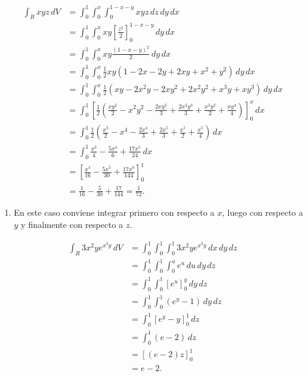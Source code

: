 \documentclass[
  spanish,
  a4paper,
]{scrreport}
\providecommand{\tightlist}{%
  \setlength{\itemsep}{0pt}\setlength{\parskip}{0pt}}
\theoremstyle{definition}
\theoremstyle{remark}
\begin{document}
\begin{tcolorbox}
\begin{align*}
\int_R xyz\,dV
&= \int_0^1 \int_0^{x} \int_0^{1-x-y} xyz\,dz\,dy\,dx \\  
&= \int_0^1 \int_0^{x} xy\left[\frac{z^2}{2}\right]_0^{1-x-y} \,dy\,dx \\  
&= \int_0^1 \int_0^{x} xy\frac{(1-x-y)^2}{2} \,dy\,dx \\  
&= \int_0^1 \int_0^{x} \frac{1}{2}xy(1-2x-2y+2xy+x^2+y^2)\,dy\,dx \\
&= \int_0^1 \int_0^{x} \frac{1}{2}(xy-2x^2y-2xy^2+2x^2y^2+x^3y+xy^3)\,dy\,dx \\
&= \int_0^1 \left[\frac{1}{2}\left(\frac{x y^2}{2}-x^2 y^2 -\frac{2x y^3}{3} + \frac{2x^2 y^3}{3} + \frac{x^3 y^2}{2} + \frac{x y^4}{4}\right)\right]_0^{x} \,dx \\
&= \int_0^1 \frac{1}{2}\left(\frac{x^3}{2}-x^4 -\frac{2x^4}{3} + \frac{2x^5}{3} + \frac{x^5}{2} + \frac{x^5}{4}\right)\,dx \\
&= \int_0^1 \frac{x^3}{4} - \frac{5x^4}{6} + \frac{17x^5}{24}\,dx \\
&= \left[\frac{x^4}{16} - \frac{5x^5}{30} + \frac{17x^6}{144}\right]_0^1 \\
&= \frac{1}{16} - \frac{5}{30} + \frac{17}{144} 
= \frac{1}{72}.
\end{align*}

\begin{enumerate}
\def\labelenumi{\alph{enumi}.}
\tightlist
\item
  En este caso conviene integrar primero con respecto a \(x\), luego con
  respecto a \(y\) y finalmente con respecto a \(z\).
\end{enumerate}

\begin{align*}
\int_R 3x^2ye^{x^3 y}\,dV
&= \int_0^1 \int_0^{1} \int_0^{1} 3x^2ye^{x^3 y}\,dx\,dy\,dz \\
&= \int_0^1 \int_0^{1} \int_0^u e^{u}\,du\,dy\,dz \tag{Cambio $u=x^3y$}\\
&= \int_0^1 \int_0^{1} [e^{u}]_0^{y}\,dy\,dz \\
&= \int_0^1 \int_0^{1} (e^{y}-1)\,dy\,dz \\
&= \int_0^1 [e^{y}-y]_0^{1}\,dz \\
&= \int_0^1 (e-2)\,dz \\
&= [ (e-2)z ]_0^1 \\
&= e-2.
\end{align*}

\end{tcolorbox}
\end{document}
